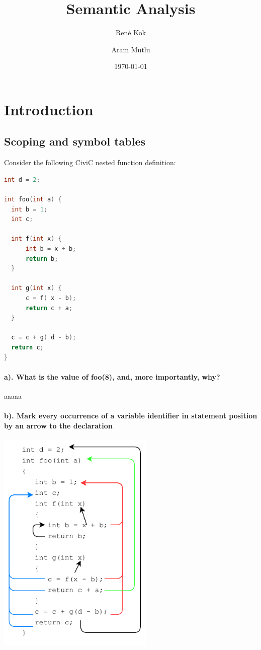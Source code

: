 \documentclass[hidelinks]{uva-inf-article}
\title{Semantic Analysis}
\author{René Kok}
\author{Aram Mutlu}
\date{\today}
\begin{document}
\maketitle


\section{Introduction}
\begin{flushleft}
\newpage
\section{Scoping and symbol tables}
Consider the following CiviC nested function definition:
\begin{lstlisting}[basicstyle=\small, language=C]
int d = 2;

int foo(int a) {
  int b = 1; 
  int c;

  int f(int x) { 
      int b = x + b;
      return b; 
  }

  int g(int x) { 
      c = f( x - b); 
      return c + a;
  }
    
  c = c + g( d - b); 
  return c;
}
\end{lstlisting}
\paragraph{a). What is the value of foo(8), and, more importantly, why?\\}
aaaaa

\newpage
\paragraph{b). Mark every occurrence of a variable identifier in statement position by an arrow to the declaration\\}
\includegraphics[width=7.5cm]{images/1b.pdf}

\end{flushleft}
\end{document}
